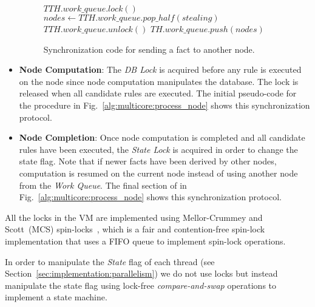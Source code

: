 \begin{itemize}
\begin{figure}
\begin{algorithm}[H]
   $TTH.work\_queue.lock()$\;
   $nodes \longleftarrow TTH.work\_queue.pop\_half(stealing)$\;
   $TTH.work\_queue.unlock()$\;
   $TH.work\_queue.push(nodes)$\;
\end{algorithm}
\caption{Synchronization code for sending a fact to another node.}
 \label{alg:multicore:steal_nodes}
\end{figure}

   \item \textbf{Node Computation}: The \emph{DB Lock} is acquired before any
      rule is executed on the node since node computation manipulates the
      database. The lock is released when all candidate rules are executed. The
      initial pseudo-code for the  procedure in
      Fig.~\ref{alg:multicore:process_node} shows this synchronization protocol.

   \item \textbf{Node Completion}: Once node computation is completed and all
      candidate rules have been executed, the \emph{State Lock} is acquired in
      order to change the state flag. Note that if newer facts have been derived
      by other nodes, computation is resumed on the current node instead of
      using another node from the \emph{Work Queue}. The final section of
       in Fig.~\ref{alg:multicore:process_node} shows this
      synchronization protocol.

\end{itemize}

All the locks in the VM are implemented using Mellor-Crummey and Scott~(MCS)
spin-locks~\cite{Mellor-Crummey:1991}, which is a fair and contention-free
spin-lock implementation that uses a FIFO queue to implement spin-lock operations.

In order to manipulate the \emph{State} flag of each thread (see
Section~\ref{sec:implementation:parallelism}) we do not use locks but instead
manipulate the state flag using lock-free \emph{compare-and-swap} operations to
implement a state machine.

